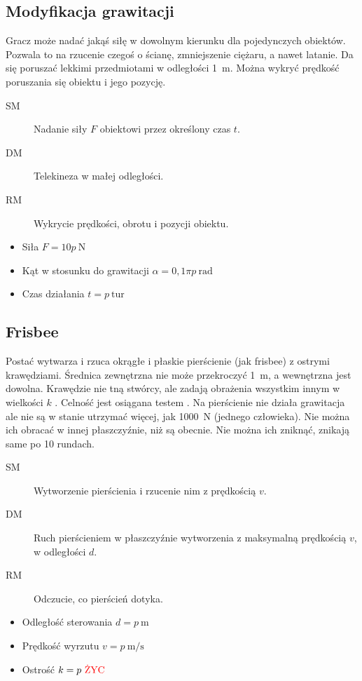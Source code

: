 \subsection{Modyfikacja grawitacji}
Gracz może nadać jakąś siłę w dowolnym kierunku dla pojedynczych obiektów.
Pozwala to na rzucenie czegoś o ścianę, zmniejszenie ciężaru, a nawet latanie.
Da się poruszać lekkimi przedmiotami w odległości \SI{1}{\metre}.
Można wykryć prędkość poruszania się obiektu i jego pozycję.
\begin{description}
	\item[SM] Nadanie siły $F$ obiektowi przez określony czas $t$.
	\item[DM] Telekineza w małej odległości.
	\item[RM] Wykrycie prędkości, obrotu i pozycji obiektu.
\end{description}
\begin{itemize}
	\item Siła $F = 10p \ \si{\newton}$
	\item Kąt w stosunku do grawitacji $\alpha = 0,1\pi p \ \si{\radian}$
	\item Czas działania $t = p \ \text{tur}$
\end{itemize}

\subsection{Frisbee}
Postać wytwarza i rzuca okrągłe i płaskie pierścienie (jak frisbee) z ostrymi krawędziami.
Średnica zewnętrzna nie może przekroczyć \SI{1}{\metre}, a wewnętrzna jest dowolna.
Krawędzie nie tną stwórcy, ale zadają obrażenia wszystkim innym w wielkości $k$ \abzyc{}.
Celność jest osiągana testem \aba{}.
Na pierścienie nie działa grawitacja ale nie są w stanie utrzymać więcej, jak \SI{1000}{\newton} (jednego człowieka).
Nie można ich obracać w innej płaszczyźnie, niż są obecnie.
Nie można ich zniknąć, znikają same po 10 rundach.
\begin{description}
	\item[SM] Wytworzenie pierścienia i rzucenie nim z prędkością $v$.
	\item[DM] Ruch pierścieniem w płaszczyźnie wytworzenia z maksymalną prędkością $v$, w odległości $d$.
	\item[RM] Odczucie, co pierścień dotyka.
\end{description}
\begin{itemize}
	\item Odległość sterowania $d = p \ \si{\metre}$
	\item Prędkość wyrzutu $v = p \ \si{\metre\per\second}$
	\item Ostrość $k = p \ \text{\abzyc{}}$
\end{itemize}

